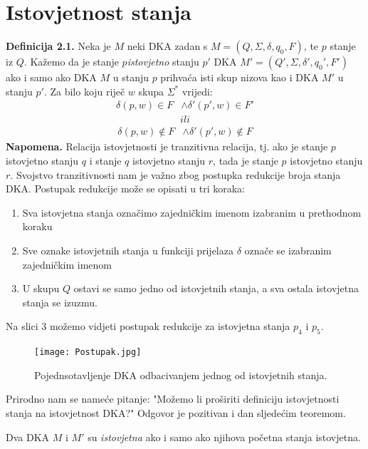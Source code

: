 \documentclass[titlepage]{article}
\begin{document}
\section{Istovjetnost stanja}
\textbf{Definicija 2.1.} Neka je $M$ neki DKA zadan s $M = (Q, \Sigma, \delta, q_0, F)$, te $p$ stanje iz $Q$. Kažemo da je stanje $p$\textit{istovjetno} stanju $p'$ DKA $M'= (Q', \Sigma, \delta', q_0', F')$ ako i samo ako DKA $M$ u stanju $p$ prihvaća isti skup nizova kao i DKA $M'$ u stanju $p'$. Za bilo koju riječ $w$ skupa $\Sigma^*$ vrijedi:
\begin{align}\label{eq1}
\delta(p,w) \in F & \wedge \delta'(p',w) \in F'
\end{align}
\begin{align*}ili 
\end{align*}
\begin{align}\label{eq2}
\delta(p,w) \notin F & \wedge \delta'(p',w) \notin F  
\end{align}
\textbf{Napomena. }Relacija istovjetnosti je tranzitivna relacija, tj. ako je stanje $p$ istovjetno stanju $q$ i stanje $q$ istovjetno stanju $r$, tada je stanje $p$ istovjetno stanju $r$. Svojstvo tranzitivnosti nam je važno zbog postupka redukcije broja stanja DKA. 
\newline
\newline
Postupak redukcije može se opisati u tri koraka: 
\begin{enumerate}
\item Sva istovjetna stanja označimo zajedničkim imenom izabranim u prethodnom koraku
\item Sve oznake istovjetnih stanja u funkciji prijelaza $\delta$ označe se izabranim zajedničkim imenom
\item U skupu $Q$ ostavi se samo jedno od istovjetnih stanja, a sva ostala istovjetna stanja se izuzmu. 
\end{enumerate}
Na slici 3 možemo vidjeti postupak redukcije za istovjetna stanja $p_4$ i $p_5$. 
\begin{figure}[h]
\centering
\texttt{[image: Postupak.jpg]}
\caption{Pojednsotavljenje DKA odbacivanjem jednog od istovjetnih stanja. 
}
\end{figure}
\newline
\newline Prirodno nam se nameće pitanje: "Možemo li proširiti definiciju istovjetnosti stanja na istovjetnost DKA?" Odgovor je pozitivan i dan sljedećim teoremom.  
\newline
\begin{thm} Dva DKA $M$ i $M'$ su \textit{istovjetna} ako i samo ako njihova početna stanja istovjetna. 
\end{thm}
\end{document}

